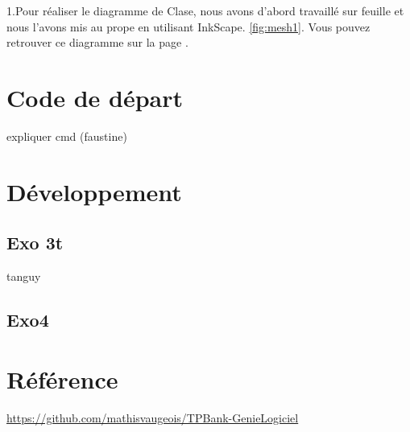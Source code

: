 \documentclass{article}
\begin{document}


1.Pour réaliser le diagramme de Clase, nous avons d'abord travaillé sur feuille et nous l'avons mis au prope en utilisant InkScape.  \ref{fig:mesh1}. Vous pouvez retrouver ce diagramme sur la page \pageref{fig:mesh1}.
\newline
\newpage
\section{Code de départ}
expliquer cmd (faustine)
\newpage
\section{Développement}
\subsection{Exo 3t}
tanguy
\subsection{Exo4}
\newpage
\section*{Référence}
\url{https://github.com/mathisvaugeois/TPBank-GenieLogiciel}
\end{document}
